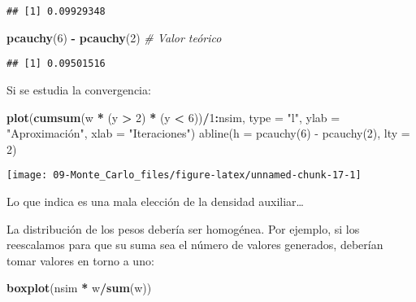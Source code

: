 \documentclass[
]{book}
\newenvironment{Shaded}{\begin{snugshade}}{\end{snugshade}}
\newcommand{\CommentTok}[1]{\textcolor[rgb]{0.56,0.35,0.01}{\textit{#1}}}
\newcommand{\DataTypeTok}[1]{\textcolor[rgb]{0.13,0.29,0.53}{#1}}
\newcommand{\DecValTok}[1]{\textcolor[rgb]{0.00,0.00,0.81}{#1}}
\newcommand{\KeywordTok}[1]{\textcolor[rgb]{0.13,0.29,0.53}{\textbf{#1}}}
\newcommand{\NormalTok}[1]{#1}
\newcommand{\OperatorTok}[1]{\textcolor[rgb]{0.81,0.36,0.00}{\textbf{#1}}}
\newcommand{\StringTok}[1]{\textcolor[rgb]{0.31,0.60,0.02}{#1}}
\theoremstyle{break}
\theoremstyle{definition}
\theoremstyle{definition}
\theoremstyle{definition}
\theoremstyle{remark}
\begin{document}
\begin{verbatim}
## [1] 0.09929348
\end{verbatim}

\begin{Shaded}
\begin{Highlighting}[]
\KeywordTok{pcauchy}\NormalTok{(}\DecValTok{6}\NormalTok{) }\OperatorTok{-}\StringTok{ }\KeywordTok{pcauchy}\NormalTok{(}\DecValTok{2}\NormalTok{)  }\CommentTok{# Valor teórico}
\end{Highlighting}
\end{Shaded}

\begin{verbatim}
## [1] 0.09501516
\end{verbatim}

Si se estudia la convergencia:

\begin{Shaded}
\begin{Highlighting}[]
\KeywordTok{plot}\NormalTok{(}\KeywordTok{cumsum}\NormalTok{(w }\OperatorTok{*}\StringTok{ }\NormalTok{(y }\OperatorTok{>}\StringTok{ }\DecValTok{2}\NormalTok{) }\OperatorTok{*}\StringTok{ }\NormalTok{(y }\OperatorTok{<}\StringTok{ }\DecValTok{6}\NormalTok{))}\OperatorTok{/}\DecValTok{1}\OperatorTok{:}\NormalTok{nsim, }\DataTypeTok{type =} \StringTok{"l"}\NormalTok{, }\DataTypeTok{ylab =} \StringTok{"Aproximación", xlab = "}\NormalTok{Iteraciones}\StringTok{")}
\StringTok{abline(h = pcauchy(6) - pcauchy(2), lty = 2)}
\end{Highlighting}
\end{Shaded}

\begin{center}\texttt{[image: 09-Monte\_Carlo\_files/figure-latex/unnamed-chunk-17-1]} \end{center}

Lo que indica es una mala elección de la densidad auxiliar\ldots{}

La distribución de los pesos debería ser homogénea.
Por ejemplo, si los reescalamos para que su suma sea el número de valores generados, deberían tomar valores en torno a uno:

\begin{Shaded}
\begin{Highlighting}[]
\KeywordTok{boxplot}\NormalTok{(nsim }\OperatorTok{*}\StringTok{ }\NormalTok{w}\OperatorTok{/}\KeywordTok{sum}\NormalTok{(w))  }
\end{Highlighting}
\end{Shaded}
\end{document}
